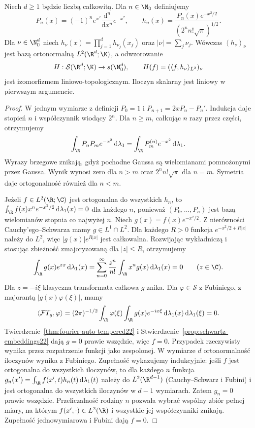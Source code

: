 \begin{lemat}
\label{lem:hermite-schwartz23}
Niech $d\ge1$ będzie liczbą całkowitą. Dla $n\in\N_0$ definiujemy
\[
 P_n(x)=(-1)^n e^{x^2}\frac{\mathrm d^n}{\mathrm dx^n}e^{-x^2},
 \qquad h_n(x)=\frac{P_n(x)e^{-x^2/2}}{(2^n n!\sqrt\pi)^{1/2}}.
\]
Dla $\nu\in\N_0^d$ niech $h_\nu(x)=\prod_{j=1}^d h_{\nu_j}(x_j)$
oraz $|\nu|=\sum_j\nu_j$. Wówczas $(h_\nu)_\nu$
jest bazą ortonormalną $L^2(\R^d;\K)$, a odwzorowanie
\[
 H:\mathcal S(\R^d;\K)\to s(\N_0^d),\qquad
 H(f)=(\langle f,h_\nu\rangle_{L^2})_\nu
\]
jest izomorfizmem liniowo-topologicznym. Iloczyn skalarny
jest liniowy w pierwszym argumencie.
\end{lemat}
\begin{proof}
W jednym wymiarze z definicji $P_0=1$ i $P_{n+1}=2xP_n-P_n'$.
Indukcja daje stopień $n$ i współczynnik wiodący $2^n$.
Dla $n\ge m$, całkując $n$ razy przez części, otrzymujemy
\[
 \int_\R P_nP_m e^{-x^2}\,\mathrm d\lambda_1
 =\int_\R P_m^{(n)}e^{-x^2}\,\mathrm d\lambda_1.
\]
Wyrazy brzegowe znikają, gdyż pochodne Gaussa są
wielomianami pomnożonymi przez Gaussa. Wynik wynosi zero
dla $n>m$ oraz $2^n n!\sqrt\pi$ dla $n=m$.
Symetria daje ortogonalność również dla $n<m$.

Jeżeli $f\in L^2(\R;\C)$ jest ortogonalna do wszystkich
$h_n$, to $\int_\R f(x)x^n e^{-x^2/2}\,\mathrm d\lambda_1(x)=0$
dla każdego $n$, ponieważ $(P_0,\ldots,P_n)$ jest bazą
wielomianów stopnia co najwyżej $n$. Niech $g(x)=f(x)e^{-x^2/2}$.
Z nierówności Cauchy'ego--Schwarza mamy $g\in L^1\cap L^2$.
Dla każdego $R>0$ funkcja $e^{-x^2/2+R|x|}$ należy do $L^2$,
więc $|g(x)|e^{R|x|}$ jest całkowalna.
Rozwijając wykładniczą i stosując zbieżność zmajoryzowaną
dla $|z|\le R$, otrzymujemy
\[
 \int_\R g(x)e^{zx}\,\mathrm d\lambda_1(x)
 =\sum_{n=0}^\infty\frac{z^n}{n!}
 \int_\R x^ng(x)\,\mathrm d\lambda_1(x)=0
 \qquad(z\in\C).
\]
Dla $z=-i\xi$ klasyczna transformata całkowa $g$ znika.
Dla $\varphi\in\mathcal S$ z Fubiniego, z majorantą
$|g(x)\varphi(\xi)|$, mamy
\[
 \langle\mathcal F T_g,\varphi\rangle
 =(2\pi)^{-1/2}\int_\R\varphi(\xi)
 \int_\R g(x)e^{-ix\xi}\,\mathrm d\lambda_1(x)
 \,\mathrm d\lambda_1(\xi)=0.
\]
Twierdzenie~\ref{thm:fourier-auto-tempered22} i
Stwierdzenie~\ref{prop:schwartz-embeddings22} dają
$g=0$ prawie wszędzie, więc $f=0$. Przypadek rzeczywisty
wynika przez rozpatrzenie funkcji jako zespolonej.
W wymiarze $d$ ortonormalność iloczynów wynika z Fubiniego.
Zupełność wykazujemy indukcyjnie: jeśli $f$ jest
ortogonalna do wszystkich iloczynów, to dla każdego $n$
funkcja $g_n(x')=\int_\R f(x',t)h_n(t)\,\mathrm d\lambda_1(t)$
należy do $L^2(\R^{d-1})$ (Cauchy--Schwarz i Fubini)
i jest ortogonalna do wszystkich iloczynów w $d-1$
wymiarach. Zatem $g_n=0$ prawie wszędzie.
Przeliczalność rodziny $n$ pozwala wybrać wspólny zbiór
pełnej miary, na którym $f(x',\cdot)\in L^2(\R)$ i
wszystkie jej współczynniki znikają. Zupełność
jednowymiarowa i Fubini dają $f=0$.


\end{proof}
